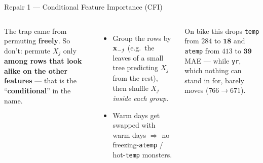 \documentclass[aspectratio=169]{beamer}
\begin{document}
\begin{frame}{Repair 1 --- Conditional Feature Importance (CFI)}
  \begin{columns}[T]
    The trap came from permuting \textbf{freely}. So don't: permute $X_j$ only \textbf{among rows
    that look alike on the other features} --- that is the ``\textbf{conditional}'' in the name.
    \vskip 4pt
    \begin{itemize}\small
      \item Group the rows by $\mathbf{x}_{-j}$ (e.g.\ the leaves of a small tree predicting $X_j$ from
        the rest), then shuffle $X_j$ \emph{inside each group}.
      \item Warm days get swapped with warm days $\Rightarrow$ no freezing-\texttt{atemp} /
        hot-\texttt{temp} monsters.
    \end{itemize}
    \vskip 4pt
    \vskip 8pt
    \footnotesize On bike this drops \texttt{temp} from $284$ to $\mathbf{18}$ and \texttt{atemp}
    from $413$ to $\mathbf{39}$ MAE --- while \texttt{yr}, which nothing can stand in for, barely
    moves ($766 \to 671$).
  \end{columns}
\end{frame}
\end{document}
